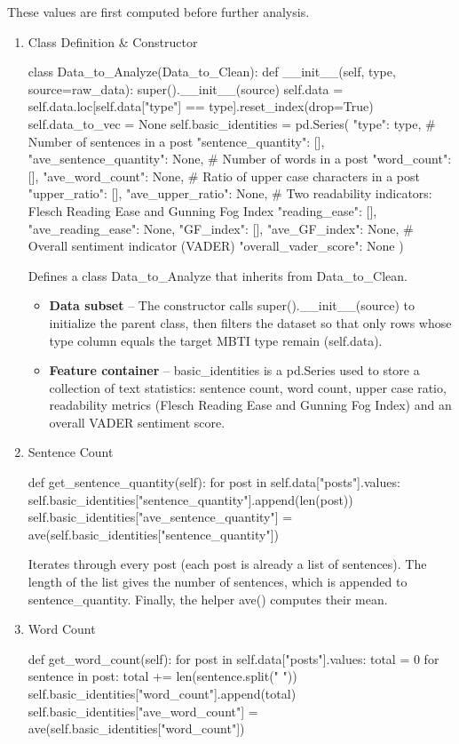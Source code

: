 \documentclass[12pt]{article}
\begin{document}
	These values are first computed before further analysis.
	\begin{enumerate}
		\item Class Definition \& Constructor
		\begin{python}
class Data_to_Analyze(Data_to_Clean):
    def __init__(self, type, source=raw_data):
        super().__init__(source)
        self.data = self.data.loc[self.data["type"] == type].reset_index(drop=True)
        self.data_to_vec = None
        self.basic_identities = pd.Series({
            "type": type,
            # Number of sentences in a post
            "sentence_quantity": [],
            "ave_sentence_quantity": None,
            # Number of words in a post
            "word_count": [],
            "ave_word_count": None,
            # Ratio of upper case characters in a post
            "upper_ratio": [],
            "ave_upper_ratio": None,
            # Two readability indicators: Flesch Reading Ease and Gunning Fog Index
            "reading_ease": [],
            "ave_reading_ease": None,
            "GF_index": [],
            "ave_GF_index": None,
            # Overall sentiment indicator (VADER)
            "overall_vader_score": None
        })

		\end{python}
		Defines a class Data\_to\_Analyze that inherits from Data\_to\_Clean.
		\begin{itemize}
			\item \textbf{Data subset} – The constructor calls super().\_\_init\_\_(source) to initialize the parent class, then filters the dataset so that only rows whose type column equals the target MBTI type remain (self.data).
			\item \textbf{Feature container} – basic\_identities is a pd.Series used to store a collection of text statistics: sentence count, word count, upper case ratio, readability metrics (Flesch Reading Ease and Gunning Fog Index) and an overall VADER sentiment score.
		\end{itemize}
		\item Sentence Count
		\begin{python}
def get_sentence_quantity(self):
    for post in self.data["posts"].values:
        self.basic_identities["sentence_quantity"].append(len(post))
    self.basic_identities["ave_sentence_quantity"] = ave(self.basic_identities["sentence_quantity"])
		\end{python}
		
		Iterates through every post (each post is already a list of sentences). The length of the list gives the number of sentences, which is appended to sentence\_quantity. Finally, the helper ave() computes their mean.
		\item Word Count
		\begin{python}
def get_word_count(self):
    for post in self.data["posts"].values:
        total = 0
        for sentence in post:
            total += len(sentence.split(" "))
        self.basic_identities["word_count"].append(total)
    self.basic_identities["ave_word_count"] = ave(self.basic_identities["word_count"])
		\end{python}
		

\end{enumerate}
\end{document}
